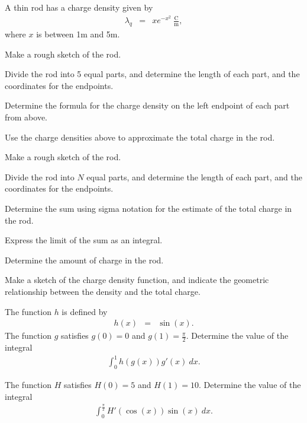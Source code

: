 \begin{problem}
\item A thin rod has a charge density given by
  \begin{eqnarray*}
    \lambda_q & = & x e^{-x^2}~\frac{\mathrm{C}}{\mathrm{m}},
  \end{eqnarray*}
  where $x$ is between 1m and 5m.
  \begin{subproblem}
  \item Make a rough sketch of the rod.
    \vspace{4em}
  \item Divide the rod into 5 equal parts, and determine the length of
    each part, and the coordinates for the endpoints.
    \vfill
  \item Determine the formula for the charge density on the left
    endpoint of each part from above.
    \vfill
  \item Use the charge densities above to approximate the total charge in the rod.
    \vfill
    \clearpage
 \item Make a rough sketch of the rod.
      \vspace{3em}
\item Divide the rod into $N$ equal parts, and determine the length of
      each part, and the coordinates for the endpoints.
      \vfill
  \item Determine the sum using sigma notation for the estimate of the
    total charge in the rod.
    \vfill
  \item Express the limit of the sum as an integral.
    \vfill
  \item Determine the amount of charge in the rod.
    \vfill
  \item Make a sketch of the charge density function, and indicate the geometric relationship between the density and the total charge.
    \vfill
  \end{subproblem}
  \clearpage
  \item The function $h$ is defined by
  \begin{eqnarray*}
    h(x) & = & \sin(x).
  \end{eqnarray*}
  The function $g$ satisfies $g(0)=0$ and $g(1)=\frac{\pi}{2}$.
  Determine the value of the integral
  \begin{eqnarray*}
    \int^1_0 h(g(x)) g'(x) ~ dx.
  \end{eqnarray*}
  \vfill

  \clearpage

  \item The function $H$ satisfies $H(0)=5$ and $H(1)=10$.
  Determine the value of the integral
  \begin{eqnarray*}
    \int^{\frac{\pi}{2}}_0 H'(\cos(x)) \sin(x) ~ dx.
  \end{eqnarray*}
  \vfill
\end{problem}


